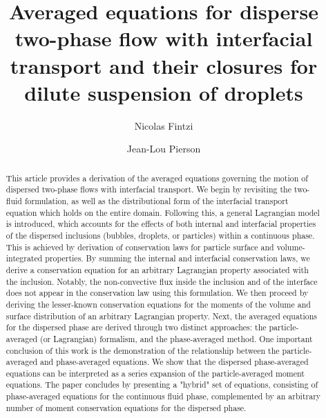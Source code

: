 \documentclass[11pt]{My_preprint}
\title{Averaged equations for disperse two-phase flow with interfacial transport and their closures for dilute suspension of droplets}
\author[1,2]{Nicolas Fintzi}
\author[1]{Jean-Lou Pierson}
\affil[1]{IFP Energies Nouvelles, Rond-point de l'echangeur de Solaize, 69360 Solaize}
\affil[2]{Sorbonne Universit\'e, Institut Jean le Rond $\partial$'Alembert, 4 place Jussieu, 75252 PARIS CEDEX 05, France}
\begin{document}
\maketitle

\begin{abstract}
This article provides a derivation of the averaged equations governing the motion of dispersed two-phase flows with interfacial transport. 
We begin by revisiting the two-fluid formulation, as well as the distributional form of the interfacial transport equation which holds on the entire domain. 
Following this, a general Lagrangian model is introduced, which accounts for the effects of both internal and interfacial properties of the dispersed inclusions (bubbles, droplets, or particles) within a continuous phase.
This is achieved by derivation of conservation laws for particle surface and volume-integrated properties. 
By summing the internal and interfacial conservation laws, we derive a conservation equation for an arbitrary Lagrangian property associated with the inclusion. 
Notably, the non-convective flux inside the inclusion and of the interface does not appear in the conservation law using this formulation. 
We then proceed by deriving the lesser-known conservation equations for the moments of the volume and surface distribution of an arbitrary Lagrangian property.  
Next, the averaged equations for the dispersed phase are derived through two distinct approaches: the particle-averaged (or Lagrangian) formalism, and the phase-averaged method. 
One important conclusion of this work is the demonstration of the relationship between the particle-averaged and phase-averaged equations. 
We show that the dispersed phase-averaged equations can be interpreted as a series expansion of the particle-averaged moment equations. 
The paper concludes by presenting a "hybrid" set of equations, consisting of phase-averaged equations for the continuous fluid phase, complemented by an arbitrary number of moment conservation equations for the dispersed phase.
\end{abstract}












\end{document}
